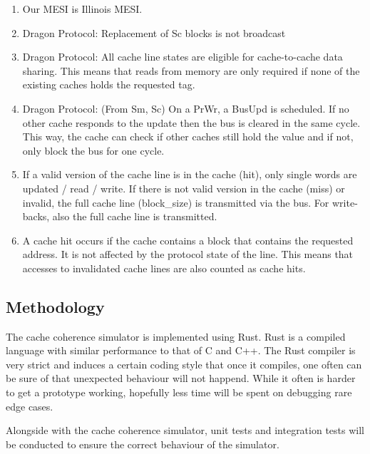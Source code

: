 \begin{enumerate}
    \item Our MESI is Illinois MESI.
    \item Dragon Protocol: Replacement of Sc blocks is not broadcast
    \item Dragon Protocol: All cache line states are eligible for cache-to-cache data sharing. This
          means that reads from memory are only required if none of the existing caches holds the requested
          tag.
    \item Dragon Protocol: (From Sm, Sc) On a PrWr, a BusUpd is scheduled. If no other cache responds to
          the update then the bus is cleared in the same cycle. This way, the cache can check if other caches
          still hold the value and if not, only block the bus for one cycle.
    \item If a valid version of the cache line is in the cache (hit), only single words are updated /
          read / write. If there is not valid version in the cache (miss) or invalid, the full cache line
          (block\_size) is transmitted via the bus. For write-backs, also the full cache line is transmitted.
    \item A cache hit occurs if the cache contains a block that contains the requested address. It is
          not affected by the protocol state of the line. This means that accesses to invalidated cache lines
          are also counted as cache hits.

\end{enumerate}
\subsection{Methodology}
The cache coherence simulator is implemented using Rust.
Rust is a compiled language with similar performance to that of C and C++.
The Rust compiler is very strict and induces a certain coding style that once it compiles, one often can be sure of that unexpected behaviour will not happend.
While it often is harder to get a prototype working, hopefully less time will be spent on debugging rare edge cases.


Alongside with the cache coherence simulator, unit tests and integration tests will be conducted to ensure the correct behaviour of the simulator.

